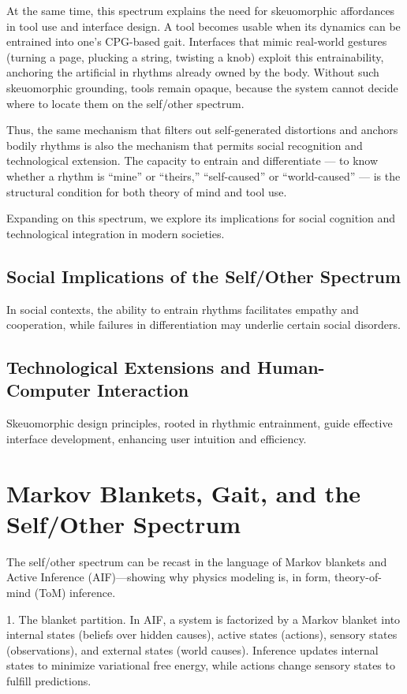 \documentclass{article}
\begin{document}
At the same time, this spectrum explains the need for skeuomorphic affordances in tool use and interface design. A tool becomes usable when its dynamics can be entrained into one’s CPG-based gait. Interfaces that mimic real-world gestures (turning a page, plucking a string, twisting a knob) exploit this entrainability, anchoring the artificial in rhythms already owned by the body. Without such skeuomorphic grounding, tools remain opaque, because the system cannot decide where to locate them on the self/other spectrum.

Thus, the same mechanism that filters out self-generated distortions and anchors bodily rhythms is also the mechanism that permits social recognition and technological extension. The capacity to entrain and differentiate — to know whether a rhythm is “mine” or “theirs,” “self-caused” or “world-caused” — is the structural condition for both theory of mind and tool use.

Expanding on this spectrum, we explore its implications for social cognition and technological integration in modern societies.

\subsection{Social Implications of the Self/Other Spectrum}

In social contexts, the ability to entrain rhythms facilitates empathy and cooperation, while failures in differentiation may underlie certain social disorders.

\subsection{Technological Extensions and Human-Computer Interaction}

Skeuomorphic design principles, rooted in rhythmic entrainment, guide effective interface development, enhancing user intuition and efficiency.

\section{Markov Blankets, Gait, and the Self/Other Spectrum}

The self/other spectrum can be recast in the language of Markov blankets and Active Inference (AIF)—showing why physics modeling is, in form, theory-of-mind (ToM) inference.

1. The blanket partition. In AIF, a system is factorized by a Markov blanket into internal states (beliefs over hidden causes), active states (actions), sensory states (observations), and external states (world causes). Inference updates internal states to minimize variational free energy, while actions change sensory states to fulfill predictions.
\end{document}
